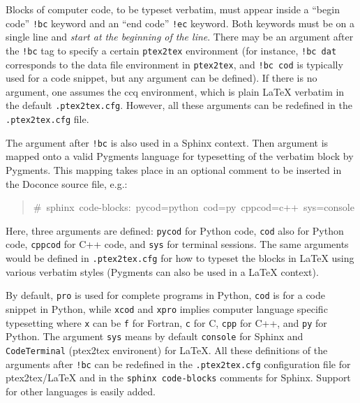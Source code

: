 \documentclass[a4paper,english]{article}
\begin{document}
Blocks of computer code, to be typeset verbatim, must appear inside a
``begin code'' \texttt{!bc} keyword and an ``end code'' \texttt{!ec} keyword. Both
keywords must be on a single line and \emph{start at the beginning of the
line}.  There may be an argument after the \texttt{!bc} tag to specify a
certain \texttt{ptex2tex} environment (for instance, \texttt{!bc dat} corresponds to
the data file environment in \texttt{ptex2tex}, and \texttt{!bc cod} is typically
used for a code snippet, but any argument can be defined). If there is
no argument, one assumes the ccq environment, which is plain LaTeX
verbatim in the default \texttt{.ptex2tex.cfg}. However, all these arguments
can be redefined in the \texttt{.ptex2tex.cfg} file.

The argument after \texttt{!bc} is also used
in a Sphinx context. Then argument is mapped onto a valid Pygments
language for typesetting of the verbatim block by Pygments. This
mapping takes place in an optional comment to be inserted in the Doconce
source file, e.g.:
%
\begin{quote}{\ttfamily \raggedright \noindent
\#~sphinx~code-blocks:~pycod=python~cod=py~cppcod=c++~sys=console
}
\end{quote}

Here, three arguments are defined: \texttt{pycod} for Python code,
\texttt{cod} also for Python code, \texttt{cppcod} for C++ code, and \texttt{sys}
for terminal sessions. The same arguments would be defined
in \texttt{.ptex2tex.cfg} for how to typeset the blocks in LaTeX using
various verbatim styles (Pygments can also be used in a LaTeX
context).

By default, \texttt{pro} is used for complete programs in Python, \texttt{cod}
is for a code snippet in Python, while \texttt{xcod} and \texttt{xpro} implies
computer language specific typesetting where \texttt{x} can be
\texttt{f} for Fortran, \texttt{c} for C, \texttt{cpp} for C++, and \texttt{py} for Python.
The argument \texttt{sys} means by default \texttt{console} for Sphinx and
\texttt{CodeTerminal} (ptex2tex environent) for LaTeX. All these definitions
of the arguments after \texttt{!bc} can be redefined in the \texttt{.ptex2tex.cfg}
configuration file for ptex2tex/LaTeX and in the \texttt{sphinx code-blocks}
comments for Sphinx. Support for other languages is easily added.


\end{document}
